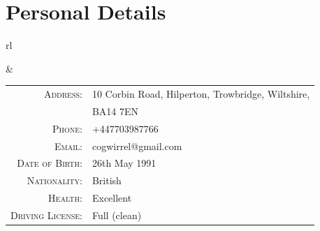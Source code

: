 \section*{Personal Details}

\begin{tabular}{rl}


&

\begin{tabular}{rl}
\textsc{Address:} & 10 Corbin Road, Hilperton, Trowbridge, Wiltshire,\\
 & BA14 7EN\\
\textsc{Phone:} & +447703987766\\
\textsc{Email:} & cogwirrel@gmail.com \\
\textsc{Date of Birth:} & 26th May 1991 \\
\textsc{Nationality:} & British \\
\textsc{Health:} & Excellent \\
\textsc{Driving License:} & Full (clean)
\end{tabular}

\end{tabular}